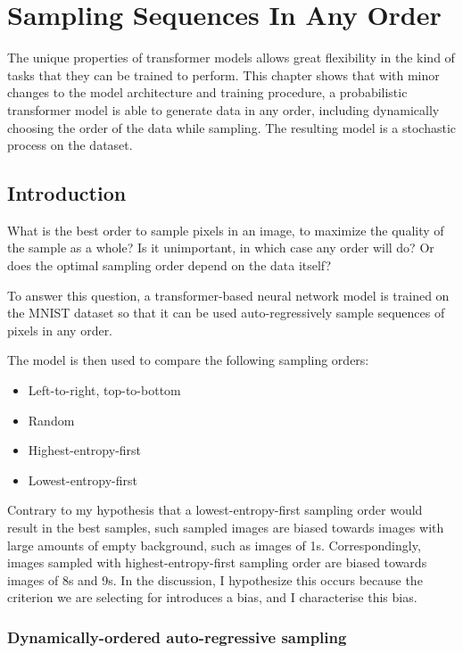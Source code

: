 \chapter{Sampling Sequences In Any Order}
\label{C:a-o-sampling}

The unique properties of transformer models allows great flexibility in the kind of tasks that they can be trained to perform. This chapter shows that with minor changes to the model architecture and training procedure, a probabilistic transformer model is able to generate data in any order, including dynamically choosing the order of the data while sampling. The resulting model is a stochastic process on the dataset.

\section{Introduction}

What is the best order to sample pixels in an image, to maximize the quality of the sample as a whole? Is it unimportant, in which case any order will do? Or does the optimal sampling order depend on the data itself?

To answer this question, a transformer-based neural network model is trained on the MNIST dataset \cite{mnist} so that it can be used auto-regressively sample sequences of pixels in any order.

The model is then used to compare the following sampling orders:
\begin{itemize}
    \item Left-to-right, top-to-bottom
    \item Random
    \item Highest-entropy-first
    \item Lowest-entropy-first
\end{itemize}

Contrary to my hypothesis that a lowest-entropy-first sampling order would result in the best samples, such sampled images are biased towards images with large amounts of empty background, such as images of 1s. Correspondingly, images sampled with highest-entropy-first sampling order are biased towards images of 8s and 9s. In the discussion, I hypothesize this occurs because the criterion we are selecting for introduces a bias, and I characterise this bias.

\subsection{Dynamically-ordered auto-regressive sampling}

